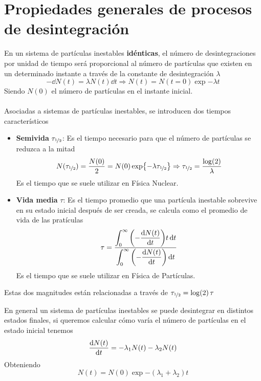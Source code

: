 \section{Propiedades generales de procesos de desintegración}
En un sistema de partículas inestables \textbf{idénticas}, el número de desintegraciones por unidad de tiempo será proporcional al número de partículas que existen en un determinado instante a través de la constante de desintegración $\lambda$ 
\begin{equation}
    -\dd N(t)=\lambda N(t) \dd t \Rightarrow N(t)=N(t=0)\exp{-\lambda t}
    \label{eq: desintegracion radiactiva}
\end{equation}
Siendo $N(0)$ el número de partículas en el instante inicial.
\\\\
Asociadas a sistemas de partículas inestables, se introducen dos tiempos característicos
\begin{itemize}
    \item \textbf{Semivida} $\tau_{\nicefrac{1}{2}}$: Es el tiempo necesario para que el número de partículas se reduzca a la mitad $$N(\tau_{\nicefrac{1}{2}})=\frac{N(0)}{2}=N(0)\exp{-\lambda \tau_{\nicefrac{1}{2}}} \Rightarrow \tau_{\nicefrac{1}{2}}=\frac{\log(2)}{\lambda}$$
    Es el tiempo que se suele utilizar en Física Nuclear.
    \item \textbf{Vida media} $\tau$: Es el tiempo promedio que una partícula inestable sobrevive en su estado inicial después de ser creada, se calcula como el promedio de vida de las pratículas
    \begin{equation}
        \tau= \frac{ \displaystyle \int^\infty _0 \qty(-\dfrac{\dd N(t)}{\dd t})t\,  \dd t }{\displaystyle \int^\infty _0 \qty(-\dfrac{\dd N(t)}{\dd t}) \, \dd t}
    \end{equation}
    Es el tiempo que se suele utilizar en Física de Partículas.
\end{itemize}
Estas dos magnitudes están relacionadas a través de $\tau_{\nicefrac{1}{2}} =\log(2) \, \tau$ \newpage
\noindent
\begin{minipage}{0.6\textwidth}
    En general un sistema de partículas inestables se puede desintegrar en distintos estados finales, si queremos calcular cómo varía el número de partículas en el estado inicial tenemos
    \begin{equation}
        \dv{N(t)}{t}=-\lambda_1 N(t)-\lambda_2 N(t)
    \end{equation}
    Obteniendo 
    \begin{equation}
        N(t)=N(0)\exp{-(\lambda_1+\lambda_2)t}
    \end{equation}
\end{minipage}
